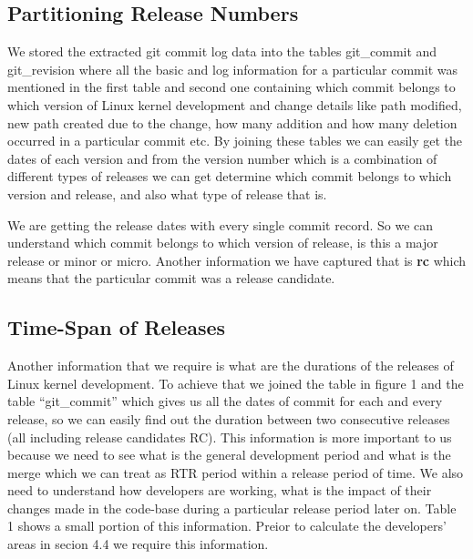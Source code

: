 \documentclass{acm_proc_article-sp}
\begin{document}
\subsection{Partitioning Release Numbers}
We stored the extracted git commit log data into the tables git\_commit and git\_revision where all the basic and log information for a particular commit was mentioned in the first table and second one containing which commit belongs to which version of Linux kernel development and change details like path modified, new path created due to the change, how many addition and how many deletion occurred in a particular commit etc. By joining these tables we can easily get the dates of each version and from the version number which is a combination of different types of releases we can get determine which commit belongs to which version and release, and also what type of release that is.

We are getting the release dates with every single commit record. So we can understand which commit belongs to which version of release, is this a major release or minor or micro. Another information we have captured that is \textbf{rc} which means that the particular commit was a release candidate.

\subsection{Time-Span of Releases}
Another information that we require is what are the durations of the releases of Linux kernel development. To achieve that we joined the table in figure 1 and the table ``git\_commit'' which gives us all the dates of commit for each and every release, so we can easily find out the duration between two consecutive releases (all including release candidates RC). This information is more important to us because we need to see what is the general development period and what is the merge which we can treat as RTR period within a release period of time. We also need to understand how developers are working, what is the impact of their changes made in the code-base during a particular release period later on. Table 1 shows a small portion of this information. Preior to calculate the developers' areas in secion 4.4 we require this information.
\end{document}
